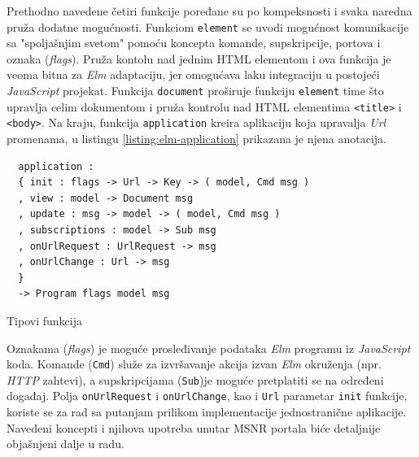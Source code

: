 \documentclass[12pt,oneside]{memoir}
\begin{document}
Prethodno navedene četiri funkcije poređane su po kompeksnosti i svaka naredna pruža dodatne mogućnosti.
Funkciom \texttt{element} se uvodi mogućnost komunikacije sa "spoljašnjim svetom" pomoću koncepta komande, supskripcije, portova
i oznaka (\emph{flags}). Pruža kontolu nad jednim HTML elementom i ova funkcija je veoma bitna za \emph{Elm} adaptaciju,
jer omogućava laku integraciju u postojeći \emph{JavaScript} projekat. 
Funkcija \texttt{document} proširuje funkciju \texttt{element} time što upravlja celim dokumentom i pruža kontrolu nad HTML elementima \texttt{<title>}
i \texttt{<body>}. Na kraju, funkcija \texttt{application} kreira aplikaciju koja upravalja \emph{Url} promenama, u listingu
\ref{listing:elm-application} prikazana je njena anotacija. 
\begin{listing}[h]
\begin{verbatim}
  application :
  { init : flags -> Url -> Key -> ( model, Cmd msg )
  , view : model -> Document msg
  , update : msg -> model -> ( model, Cmd msg )
  , subscriptions : model -> Sub msg
  , onUrlRequest : UrlRequest -> msg
  , onUrlChange : Url -> msg
  }
  -> Program flags model msg
\end{verbatim}
\caption{Tipovi funkcija}
\label{listing:elm-application}
\end{listing} 

Oznakama (\emph{flags}) je moguće prosleđivanje podataka \emph{Elm} programu iz \emph{JavaScript} koda.
Komande (\texttt{Cmd}) služe za izvršavanje akcija izvan \emph{Elm} okruženja (npr. \emph{HTTP} zahtevi), a supskripcijama
(\texttt{Sub})je moguće pretplatiti se na određeni događaj. Polja \texttt{onUrlRequest} i \texttt{onUrlChange}, kao i
\texttt{Url} parametar \texttt{init} funkcije, koriste se za rad sa putanjam prilikom implementacije jednostranične aplikacije.
Navedeni koncepti i njihova upotreba unutar MSNR portala biće detaljnije objašnjeni dalje u radu.
\end{document}
